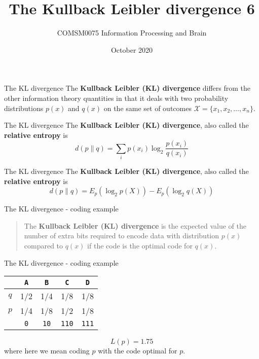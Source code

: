 \documentclass{beamer}
\title[Information Theory task 2]{The Kullback Leibler divergence 6}
\author{COMSM0075 Information Processing and Brain}
\institute{\texttt{comsm0075.github.io}}
\date{October 2020}
\newcommand{\crish}{\color{reddish}}
\newcommand{\cbla}{\color{black}}
\newcommand{\letter}[1]{\color{blue}\texttt{#1}\color{black}}
\newcommand{\binary}[1]{\color{red}\texttt{#1}\color{black}}
\begin{document}
\maketitle

\begin{frame}{The KL divergence}
  The \textbf{Kullback Leibler (KL) divergence} differs from the other
  information theory quantities in that it deals with two probability
  distributions $p(x)$ and $q(x)$ on the same set of outcomes
  \crish$\mathcal{X}=\{x_1,x_2,\ldots,x_n\}$\cbla.
\end{frame}

\begin{frame}{The KL divergence}
  The \textbf{Kullback Leibler (KL) divergence}, also called the \textbf{relative entropy} is
  \crish
  $$
  d(p\|q)=\sum_i p(x_i)\log_2{\frac{p(x_i)}{q(x_i)}}
    $$
    \cbla
\end{frame}

\begin{frame}{The KL divergence}
  The \textbf{Kullback Leibler (KL) divergence}, also called the \textbf{relative entropy} is
  \crish
  $$
  d(p\|q)=E_p(\log_2{p(X)})-E_p(\log_2{q(X)})
    $$
    \cbla
\end{frame}


\begin{frame}{The KL divergence - coding example}
\begin{quote}
  The \textbf{Kullback Leibler (KL) divergence} is the expected value
  of the number of extra bits required to encode data with
  distribution $p(x)$ compared to $q(x)$ if the code is the optimal code for
  $q(x)$.
  \end{quote}
\end{frame}

\begin{frame}{The KL divergence - coding example}

\begin{center}
\begin{tabular}{c|cccc}
&\letter{A}&\letter{B}&\letter{C}&\letter{D}\\
\hline
$q$&1/2&1/4&1/8&1/8\\
$p$&1/4&1/8&1/2&1/8\\
\hline
&\binary{0}&\binary{10}&\binary{110}&\binary{111}
\end{tabular}
\end{center}
\crish
$$
L(p)=1.75
$$
\cbla
where here we mean coding \crish$p$\cbla{} with the code optimal for $p$.  
\end{frame}
\end{document}
